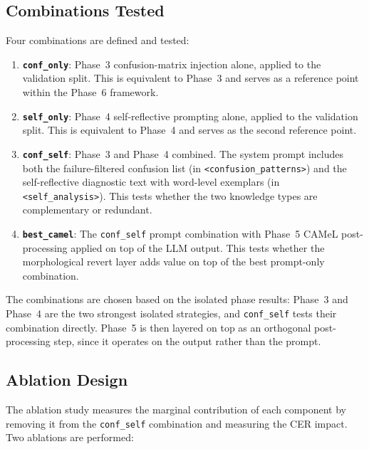 \subsection{Combinations Tested}
\label{subsec:phase6_combos}

Four combinations are defined and tested:

\begin{enumerate}
  \item \textbf{\texttt{conf\_only}}: Phase~3 confusion-matrix injection
        alone, applied to the validation split. This is equivalent to
        Phase~3 and serves as a reference point within the Phase~6 framework.

  \item \textbf{\texttt{self\_only}}: Phase~4 self-reflective prompting
        alone, applied to the validation split. This is equivalent to
        Phase~4 and serves as the second reference point.

  \item \textbf{\texttt{conf\_self}}: Phase~3 and Phase~4 combined.
        The system prompt includes both the failure-filtered confusion list
        (in \texttt{<confusion\_patterns>}) and the self-reflective diagnostic
        text with word-level exemplars (in \texttt{<self\_analysis>}).
        This tests whether the two knowledge types are complementary or
        redundant.

  \item \textbf{\texttt{best\_camel}}: The \texttt{conf\_self} prompt
        combination with Phase~5 CAMeL post-processing applied on top of the
        LLM output. This tests whether the morphological revert layer adds
        value on top of the best prompt-only combination.
\end{enumerate}

The combinations are chosen based on the isolated phase results: Phase~3 and
Phase~4 are the two strongest isolated strategies, and \texttt{conf\_self}
tests their combination directly. Phase~5 is then layered on top as an
orthogonal post-processing step, since it operates on the output rather than
the prompt.

\subsection{Ablation Design}
\label{subsec:phase6_ablation}

The ablation study measures the marginal contribution of each component by
removing it from the \texttt{conf\_self} combination and measuring the CER
impact. Two ablations are performed:

